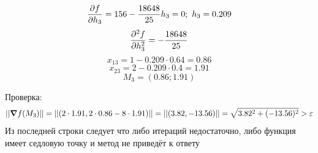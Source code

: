 \documentclass{article}
\begin{document}
\[\pdv{f}{h_3} = 156 - \frac{18648}{25}h_3= 0;\ h_3 = 0.209\]
\[\pdv{^2f}{h_3^2} = -\frac{18648}{25}\]
\[x_{13} = 1 - 0.209\cdot 0.64  = 0.86\]
\[x_{23} = 2 - 0.209\cdot 0.4 = 1.91\]
\[M_3 = (0.86; 1.91)\]

Проверка:
\[||\grad f(M_3)|| = ||(2\cdot1.91,2\cdot0.86-8\cdot1.91)|| = ||(3.82,-13.56)|| = \sqrt{3.82^2 + (-13.56)^2} > \varepsilon\]
Из последней строки следует что либо итераций недостаточно, либо функция имеет седловую точку и метод не приведёт к ответу
\end{document}
